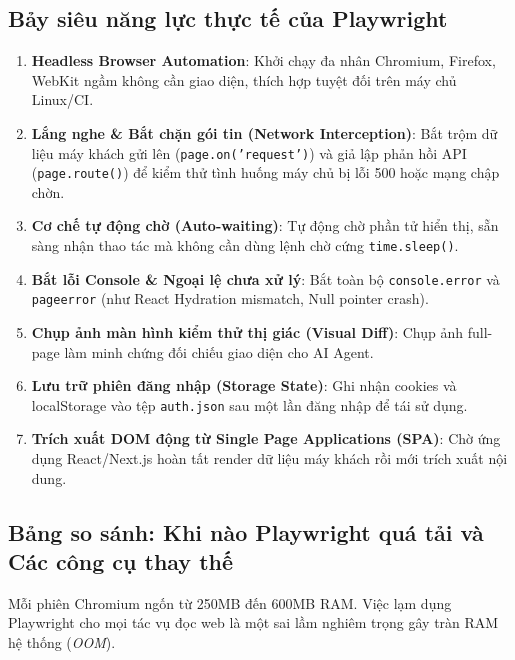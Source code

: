\documentclass[a4paper,11pt]{article}
\begin{document}
\subsection{Bảy siêu năng lực thực tế của Playwright}
\begin{enumerate}[label={\arabic*.}]
    \item \textbf{Headless Browser Automation}: Khởi chạy đa nhân Chromium, Firefox, WebKit ngầm không cần giao diện, thích hợp tuyệt đối trên máy chủ Linux/CI.
    \item \textbf{Lắng nghe \& Bắt chặn gói tin (Network Interception)}: Bắt trộm dữ liệu máy khách gửi lên (\texttt{page.on('request')}) và giả lập phản hồi API (\texttt{page.route()}) để kiểm thử tình huống máy chủ bị lỗi 500 hoặc mạng chập chờn.
    \item \textbf{Cơ chế tự động chờ (Auto-waiting)}: Tự động chờ phần tử hiển thị, sẵn sàng nhận thao tác mà không cần dùng lệnh chờ cứng \texttt{time.sleep()}.
    \item \textbf{Bắt lỗi Console \& Ngoại lệ chưa xử lý}: Bắt toàn bộ \texttt{console.error} và \texttt{pageerror} (như React Hydration mismatch, Null pointer crash).
    \item \textbf{Chụp ảnh màn hình kiểm thử thị giác (Visual Diff)}: Chụp ảnh full-page làm minh chứng đối chiếu giao diện cho AI Agent.
    \item \textbf{Lưu trữ phiên đăng nhập (Storage State)}: Ghi nhận cookies và localStorage vào tệp \texttt{auth.json} sau một lần đăng nhập để tái sử dụng.
    \item \textbf{Trích xuất DOM động từ Single Page Applications (SPA)}: Chờ ứng dụng React/Next.js hoàn tất render dữ liệu máy khách rồi mới trích xuất nội dung.
\end{enumerate}

\subsection{Bảng so sánh: Khi nào Playwright quá tải và Các công cụ thay thế}
Mỗi phiên Chromium ngốn từ 250MB đến 600MB RAM. Việc lạm dụng Playwright cho mọi tác vụ đọc web là một sai lầm nghiêm trọng gây tràn RAM hệ thống (\textit{OOM}).
\end{document}
